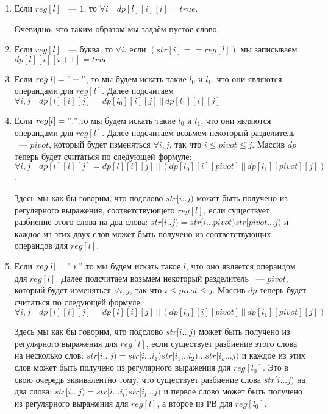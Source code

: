 \documentclass[12pt,a4paper]{extreport}
\begin{document}
\begin{enumerate}
    \item Если $reg[l]$ ~--- $1$, то $\forall i \quad dp[l][i][i] = true$.
    \par Очевидно, что таким образом мы задаём пустое слово.
    
    \item Если $reg[l]$ ~--- буква, то $\forall i$, если $(str[i] == reg[l])$ мы записываем $dp[l][i][i + 1] = true$
    
    \item Если $reg[l] = "+"$, то мы будем искать такие $l_0$ и $l_1$, что они являются операндами для $reg[l]$. Далее подсчитаем $\forall i, j \quad dp[l][i][j] = dp[l_0][i][j] \, || \, dp[l_1][i][j]$
    
    \item Если $reg[l] = "."$,то мы будем искать такие $l_0$ и $l_1$, что они являются операндами для $reg[l]$. Далее подсчитаем возьмем некоторый разделитель ~--- $pivot$, который будет изменяться $\forall i,j$, так что $i \leq pivot \leq j$. Массив $dp$ теперь будет считаться по следующей формуле: \[\forall i, j \quad dp[l][i][j] = dp[l][i][j] \, || \, (dp[l_0][i][pivot] \, || \, dp[l_1][pivot][j])\].
    
    \par Здесь мы как бы говорим, что подслово $str[i..j)$ может быть получено из регулярного выражения, соответствующего $reg[l]$, если существует разбиение этого слова на два слова: $str[i..j) = str[i...pivot)str[pivot...j)$ и каждое из этих двух слов может быть получено из соответствующих операндов для $reg[l]$.
    
    \item Если $reg[l] = "*"$,то мы будем искать такое $l$, что оно является операндом для $reg[l]$. Далее подсчитаем возьмем некоторый разделитель ~--- $pivot$, который будет изменяться $\forall i,j$, так что $i \leq pivot \leq j$. Массив $dp$ теперь будет считаться по следующей формуле: \[\forall i, j \quad dp[l][i][j] = dp[l][i][j] \, || \, (dp[l_0][i][pivot] \, || \, dp[l_1][pivot][j])\]
    
    \par Здесь мы как бы говорим, что подслово $str[i...j)$ может быть получено из регулярного выражения для $reg[l]$, если существует разбиение этого слова на несколько слов: $str[i...j) = str[i...i_1)str[i_1...i_2) \dots str[i_k...j)$ и каждое из этих слов может быть получено из регулярного выражения для $reg[l_0]$. Это в свою очередь эквивалентно тому, что существует разбиение слова $str[i...j)$ на два слова: $str[i...j) = str[i...i_l)str[i_l...j)$ и первое слово может быть получено из регулярного выражения для $reg[l]$, а второе из РВ для $reg[l_0]$.
\end{enumerate}
\end{document}

